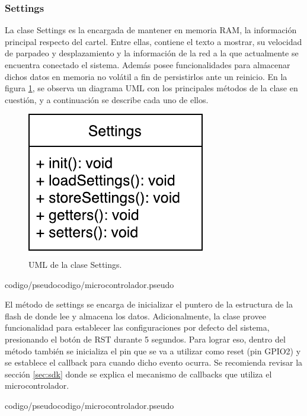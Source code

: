 \subsubsection{Settings}

La clase Settings es la encargada de mantener en memoria RAM, la información principal respecto del cartel.
Entre ellas, contiene el texto a mostrar, su velocidad de parpadeo y desplazamiento y la información de la red a la que actualmente se encuentra conectado el sistema.
Además posee funcionalidades para almacenar dichos datos en memoria no volátil a fin de persistirlos ante un reinicio.
En la figura \ref{uml:settings}, se observa un diagrama UML con los principales métodos de la clase en cuestión, y a continuación se describe cada uno de ellos.

\begin{figure}[!ht]
	\centering
	\includegraphics[scale=0.8]{imagenes/uml/settings.pdf}
	\caption{UML de la clase Settings.}
	\label{uml:settings}
\end{figure}

 {codigo/pseudocodigo/microcontrolador.pseudo}

El método  de settings se encarga de inicializar el puntero de la estructura de la flash de donde lee y almacena los datos.
Adicionalmente, la clase provee funcionalidad para establecer las configuraciones por defecto del sistema, presionando el botón de RST durante 5 segundos.
Para lograr eso, dentro del método  también se inicializa el pin que se va a utilizar como reset (pin GPIO2) y se establece el callback para cuando dicho evento ocurra.
Se recomienda revisar la sección \ref{sec:sdk} donde se explica el mecanismo de callbacks que utiliza el microcontrolador.

 {codigo/pseudocodigo/microcontrolador.pseudo}

